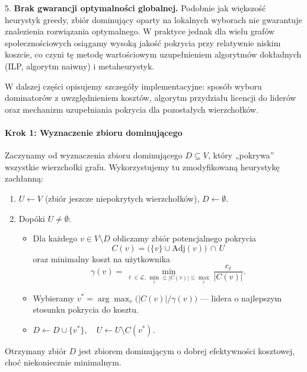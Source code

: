 5. \textbf{Brak gwarancji optymalności globalnej.} Podobnie jak większość heurystyk greedy, zbiór dominujący oparty na lokalnych wyborach nie gwarantuje znalezienia rozwiązania optymalnego. W praktyce jednak dla wielu grafów społecznościowych osiągamy wysoką jakość pokrycia przy relatywnie niskim koszcie, co czyni tę metodę wartościowym uzupełnieniem algorytmów dokładnych (ILP, algorytm naiwny) i metaheurystyk.

W dalszej części opisujemy szczegóły implementacyjne: sposób wyboru dominatorów z uwzględnieniem kosztów, algorytm przydziału licencji do liderów oraz mechanizm uzupełniania pokrycia dla pozostałych wierzchołków.  

\paragraph{Krok 1: Wyznaczenie zbioru dominującego}  
Zaczynamy od wyznaczenia zbioru dominującego $D\subseteq V$, który „pokrywa” wszystkie wierzchołki grafu. Wykorzystujemy tu zmodyfikowaną heurystykę zachłanną:
\begin{enumerate}
  \item $U \leftarrow V$ (zbiór jeszcze niepokrytych wierzchołków), $D\leftarrow\emptyset$.
  \item Dopóki $U\neq\emptyset$:
    \begin{itemize}
      \item Dla każdego $v\in V\setminus D$ obliczamy zbiór potencjalnego pokrycia 
      \[
        C(v) = \bigl(\{v\}\cup \mathrm{Adj}(v)\bigr)\,\cap\,U
      \]
      oraz minimalny koszt na użytkownika 
      \[
        \gamma(v)=\min_{\ell\in\mathcal{L},\,\min_\ell\le|C(v)|\le\max_\ell}
          \frac{c_\ell}{|C(v)|}.
      \]
      \item Wybieramy $v^*=\arg\max_{v} \bigl(|C(v)|/\gamma(v)\bigr)$ — lidera o najlepszym stosunku pokrycia do kosztu.
      \item $D\leftarrow D\cup\{v^*\},\quad U\leftarrow U\setminus C(v^*)$.
    \end{itemize}
\end{enumerate}
Otrzymany zbiór $D$ jest zbiorem dominującym o dobrej efektywności kosztowej, choć niekoniecznie minimalnym.

